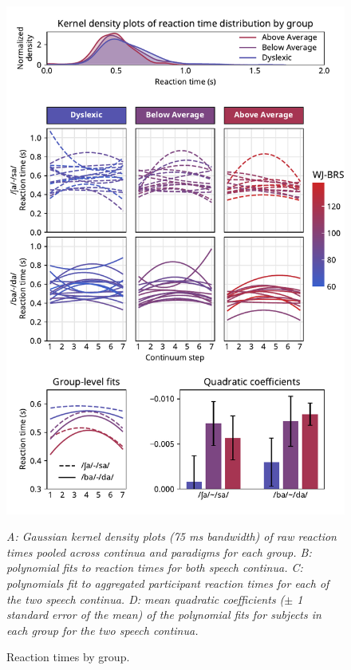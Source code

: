 \documentclass[../uwthesis.tex]{subfiles}
\begin{document}
\begin{figure}
    \centering
    \caption{Reaction times by group.}
    \label{fig:e}
    \includegraphics[width = 12 cm]{images/paper_1/figure_reaction_times.pdf}
    \item \textit{A: Gaussian kernel density plots (75 ms bandwidth) of raw reaction times pooled across continua and paradigms for each group. B: polynomial fits to reaction times for both speech continua. C: polynomials fit to aggregated participant reaction times for each of the two speech continua. D: mean quadratic coefficients ($\pm$ 1 standard error of the mean) of the polynomial fits for subjects in each group for the two speech continua.}
\end{figure}
\end{document}
